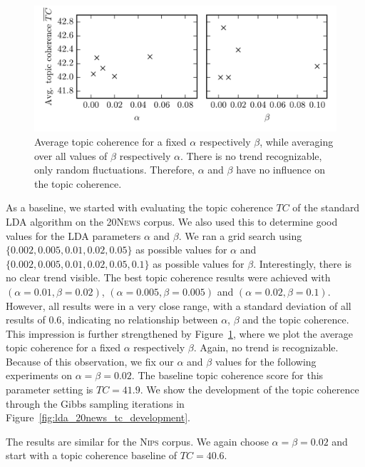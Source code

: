 \documentclass[
        a4paper,
        titlepage,
        twoside,
        parskip,
        numbers=noenddot
        ]{scrbook}
\theoremstyle{break}
\begin{document}
\begin{figure}
       \centering
       \includegraphics[width=12cm]{figures/standard_lda_alpha_beta.png}
       \caption{Average topic coherence for a fixed $\alpha$ respectively $\beta$, while averaging over all values of $\beta$ respectively $\alpha$. There is no trend recognizable, only random fluctuations. Therefore, $\alpha$ and $\beta$ have no influence on the topic coherence.}
       \label{fig:standard_lda_alpha_beta}
\end{figure}
As a baseline, we started with evaluating the topic coherence $TC$ of the standard LDA algorithm on the \textsc{20News} corpus.
We also used this to determine good values for the LDA parameters $\alpha$ and $\beta$.
We ran a grid search using $\{0.002, 0.005, 0.01, 0.02, 0.05\}$ as possible values for $\alpha$ and $\{0.002, 0.005, 0.01, 0.02, 0.05, 0.1\}$ as possible values for $\beta$.
Interestingly, there is no clear trend visible.
The best topic coherence results were achieved with $(\alpha=0.01,\beta=0.02)$, $(\alpha=0.005,\beta=0.005)$ and $(\alpha=0.02,\beta=0.1)$.
However, all results were in a very close range, with a standard deviation of all results of $0.6$, indicating no relationship between $\alpha$, $\beta$ and the topic coherence.
This impression is further strengthened by Figure~\ref{fig:standard_lda_alpha_beta}, where we plot the average topic coherence for a fixed $\alpha$ respectively $\beta$.
Again, no trend is recognizable.
Because of this observation, we fix our $\alpha$ and $\beta$ values for the following experiments on $\alpha = \beta = 0.02$.
The baseline topic coherence score for this parameter setting is $TC = 41.9$.
We show the development of the topic coherence through the Gibbs sampling iterations in Figure~\ref{fig:lda_20news_tc_development}.

The results are similar for the \textsc{Nips} corpus.
We again choose $\alpha = \beta = 0.02$ and start with a topic coherence baseline of $TC = 40.6$.
\end{document}
